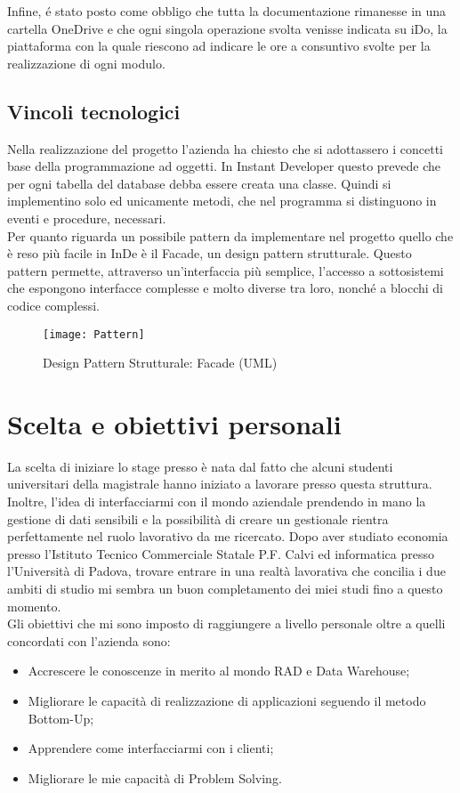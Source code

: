 Infine, é stato posto come obbligo che tutta la documentazione rimanesse in una cartella OneDrive e che ogni singola operazione svolta venisse indicata su iDo, la piattaforma con la quale riescono ad indicare le ore a consuntivo svolte per la realizzazione di ogni modulo.


\subsection{Vincoli tecnologici}
Nella realizzazione del progetto l'azienda ha chiesto che si adottassero i concetti base della programmazione ad oggetti. In Instant Developer questo prevede che per ogni tabella del database debba essere creata una classe. Quindi si implementino solo ed unicamente metodi, che nel programma si distinguono in eventi e procedure, necessari. \\


Per quanto riguarda un possibile pattern da implementare nel progetto quello che è reso più facile in InDe è il Facade, un design pattern strutturale. Questo pattern permette, attraverso un'interfaccia più semplice, l'accesso a sottosistemi che espongono interfacce complesse e molto diverse tra loro, nonché a blocchi di codice complessi. 


\begin{figure}[!h] 
	\centering 
	\texttt{[image: Pattern]} 
	\caption{Design Pattern Strutturale: Facade (UML)}
	\label{Pattern}
\end{figure}


\section{Scelta e obiettivi personali}
La scelta di iniziare lo stage presso \azienda è nata dal fatto che alcuni studenti universitari della magistrale hanno iniziato a lavorare presso questa struttura. Inoltre, l'idea di interfacciarmi con il mondo aziendale prendendo in mano la gestione di dati sensibili e la possibilità di creare un gestionale rientra perfettamente nel ruolo lavorativo da me ricercato. Dopo aver studiato economia presso l'Istituto Tecnico Commerciale Statale P.F. Calvi ed informatica presso l'Università di Padova, trovare entrare in una realtà lavorativa che concilia i due ambiti di studio mi sembra un buon completamento dei miei studi fino a questo momento.\\

Gli obiettivi che mi sono imposto di raggiungere a livello personale oltre a quelli concordati con l'azienda sono: 
\begin{itemize}
	\item Accrescere le conoscenze in merito al mondo RAD e Data Warehouse;
	\item Migliorare le capacità di realizzazione di applicazioni seguendo il metodo Bottom-Up;
	\item Apprendere come interfacciarmi con i clienti;
	\item Migliorare le mie capacità di Problem Solving.
\end{itemize}
\newpage

